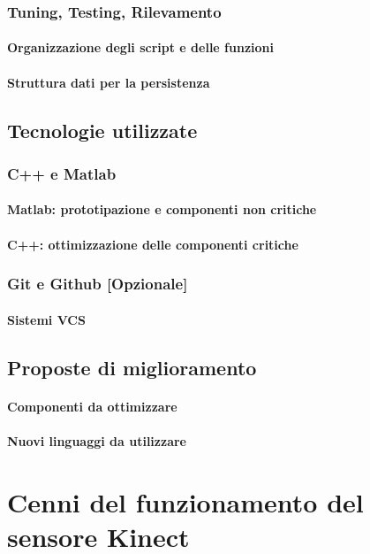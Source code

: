 \begin{appendices}
            \subsection{Tuning, Testing, Rilevamento}
                \subsubsection{Organizzazione degli script e delle funzioni}
                \subsubsection{Struttura dati per la persistenza}
        \section{Tecnologie utilizzate}
            \subsection{C++ e Matlab}
                \subsubsection{Matlab: prototipazione e componenti non critiche}
                \subsubsection{C++: ottimizzazione delle componenti critiche}
            \subsection{Git e Github [Opzionale]}
                \subsubsection{Sistemi VCS}
        \section{Proposte di miglioramento}
            \subsubsection{Componenti da ottimizzare}
            \subsubsection{Nuovi linguaggi da utilizzare}

    \chapter{Cenni del funzionamento del sensore Kinect}
    \label{chap:kinect_sensor}
\end{appendices}
